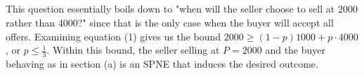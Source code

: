 \documentclass{article}
\begin{document}
\subsection{}
This question essentially boils down to "when will the seller choose to sell at 2000 rather than 4000?" since that is the only case when the buyer will accept all offers. Examining equation (1) gives us the bound $2000 \geq (1-p)1000 + p\cdot4000$, or $p \leq \frac{1}{3}$. Within this bound, the seller selling at $P = 2000$ and the buyer behaving as in section (a) is an SPNE that induces the desired outcome.
\end{document}
